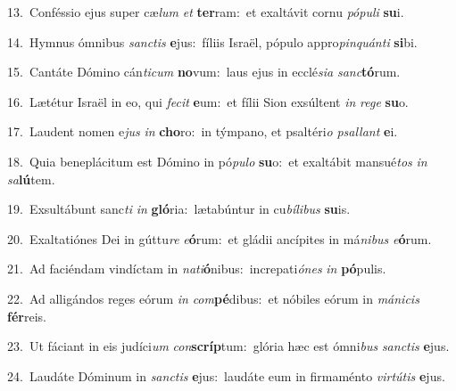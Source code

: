 {\numbfont\textcolor{\numbcolor}{13.}}~Conféssio ejus super cæ\textit{lum} \textit{et} \textbf{ter}\-ram:~\star et exaltávit cornu \textit{pó}\-\textit{pu}\textit{li} \textbf{su}\-i.\par
{\numbfont\textcolor{\numbcolor}{14.}}~Hymnus ómnibus \textit{sanc}\-\textit{tis} \textbf{e}\-jus:~\star fíliis Israël, pópulo appro\-\textit{pin}\-\textit{quán}\textit{ti} \textbf{si}\-bi.\par
{\numbfont\textcolor{\numbcolor}{15.}}~Cantáte Dómino cán\-\textit{ti}\-\textit{cum} \textbf{no}\-vum:~\star laus ejus in ecclé\-\textit{si}\-\textit{a} \textit{sanc}\-\textbf{tó}rum.\par
{\numbfont\textcolor{\numbcolor}{16.}}~Lætétur Israël in eo, qui \textit{fe}\-\textit{cit} \textbf{e}\-um:~\star et fílii Sion exsúltent \textit{in} \textit{re}\-\textit{ge} \textbf{su}\-o.\par
{\numbfont\textcolor{\numbcolor}{17.}}~Laudent nomen e\textit{jus} \textit{in} \textbf{cho}\-ro:~\star in týmpano, et psaltéri\textit{o} \textit{psal}\-\textit{lant} \textbf{e}\-i.\par
{\numbfont\textcolor{\numbcolor}{18.}}~Quia beneplácitum est Dómino in pó\-\textit{pu}\-\textit{lo} \textbf{su}\-o:~\star et exaltábit mansué\textit{tos} \textit{in} \textit{sa}\-\textbf{lú}tem.\par
{\numbfont\textcolor{\numbcolor}{19.}}~Exsultábunt sanc\textit{ti} \textit{in} \textbf{gló}\-ria:~\star lætabúntur in cu\-\textit{bí}\-\textit{li}\textit{bus} \textbf{su}\-is.\par
{\numbfont\textcolor{\numbcolor}{20.}}~Exaltatiónes Dei in gúttu\textit{re} \textit{e}\-\textbf{ó}rum:~\star et gládii ancípites in má\-\textit{ni}\-\textit{bus} \textit{e}\-\textbf{ó}rum.\par
{\numbfont\textcolor{\numbcolor}{21.}}~Ad faciéndam vindíctam in \textit{na}\-\textit{ti}\textbf{ó}nibus:~\star increpati\-\textit{ó}\-\textit{nes} \textit{in} \textbf{pó}\-pulis.\par
{\numbfont\textcolor{\numbcolor}{22.}}~Ad alligándos reges eórum \textit{in} \textit{com}\-\textbf{pé}dibus:~\star et nóbiles eórum in \textit{má}\-\textit{ni}\textit{cis} \textbf{fér}\-reis.\par
{\numbfont\textcolor{\numbcolor}{23.}}~Ut fáciant in eis judíci\textit{um} \textit{con}\-\textbf{scríp}tum:~\star glória hæc est ómni\textit{bus} \textit{sanc}\-\textit{tis} \textbf{e}\-jus.\par
{\numbfont\textcolor{\numbcolor}{24.}}~Laudáte Dóminum in \textit{sanc}\-\textit{tis} \textbf{e}\-jus:~\star laudáte eum in firmaménto \textit{vir}\-\textit{tú}\textit{tis} \textbf{e}\-jus.\par
